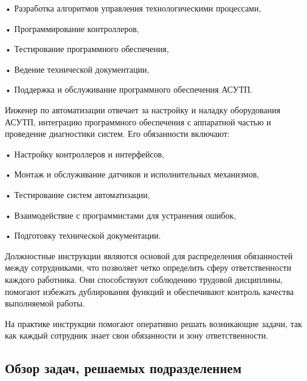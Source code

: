 {	\par \redline • Разработка алгоритмов управления технологическими процессами,
	\par \redline • Программирование контроллеров,
	\par \redline • Тестирование программного обеспечения,
	\par \redline • Ведение технической документации,
	\par \redline • Поддержка и обслуживание программного обеспечения АСУТП.
	
	\par \redline Инженер по автоматизации отвечает за настройку и наладку оборудования АСУТП, интеграцию программного обеспечения с аппаратной частью и проведение диагностики систем. Его обязанности включают:
	
	\par \redline • Настройку контроллеров и интерфейсов,
	\par \redline • Монтаж и обслуживание датчиков и исполнительных механизмов,
	\par \redline • Тестирование систем автоматизации,
	\par \redline • Взаимодействие с программистами для устранения ошибок,
	\par \redline • Подготовку технической документации.
	
	\par \redline Должностные инструкции являются основой для распределения обязанностей между сотрудниками, что позволяет четко определить сферу ответственности каждого работника. Они способствуют соблюдению трудовой дисциплины, помогают избежать дублирования функций и обеспечивают контроль качества выполняемой работы.
	
	\par \redline На практике инструкции помогают оперативно решать возникающие задачи, так как каждый сотрудник знает свои обязанности и зону ответственности. 
	
	\par 
}


\subtitlespace

\subsection*{  
	\gostTitleFont
	 Обзор задач, решаемых подразделением
} 

\subtitlespace

